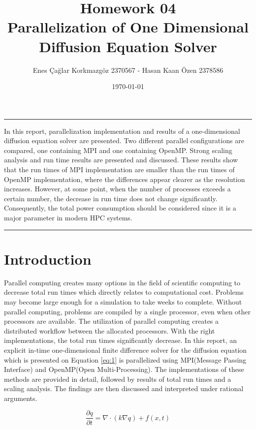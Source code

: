 \documentclass[12pt]{article}
\title{Homework 04\\ Parallelization of One Dimensional Diffusion Equation Solver}
\date{\today}
\author{Enes Çağlar Korkmazgöz 2370567 - Hasan Kaan Özen 2378586}
\renewenvironment{abstract}
{\quotation
  {\large\bfseries\abstractname\centering\par\noindent\rule{\linewidth}{.5pt}\medskip}
  \noindent}
{\par\noindent\rule{\linewidth}{.5pt}\endquotation}
\begin{document}
\maketitle
\begin{abstract}
In this report, parallelization implementation and results of a one-dimensional diffusion equation solver are presented. Two different parallel configurations are compared, one containing MPI and one containing OpenMP. Strong scaling analysis and run time results are presented and discussed. These results show that the run times of MPI implementation are smaller than the run times of OpenMP implementation, where the differences appear clearer as the resolution increases. However, at some point, when the number of processes exceeds a certain number, the decrease in run time does not change significantly. Consequently, the total power consumption should be considered since it is a major parameter in modern HPC systems.
\end{abstract}
\newpage
\tableofcontents
\newpage
\section{Introduction}
\noindent
Parallel computing creates many options in the field of scientific computing to decrease total run times which directly relates to computational cost. Problems may become large enough for a simulation to take weeks to complete. Without parallel computing, problems are compiled by a single processor, even when other processors are available. The utilization of parallel computing creates a distributed workflow between the allocated processors. With the right implementations, the total run times significantly decrease. In this report, an explicit in-time one-dimensional finite difference solver for the diffusion equation which is presented on Equation \ref{eq:1} is parallelized using MPI(Message Passing Interface) and OpenMP(Open Multi-Processing). The implementations of these methods are provided in detail, followed by results of total run times and a scaling analysis. The findings are then discussed and interpreted under rational arguments.



\begin{equation}
\label{eq:1}
    \frac{\partial q}{\partial t} = \nabla \cdot (k\nabla q) + f(x,t)
\end{equation}
\end{document}
